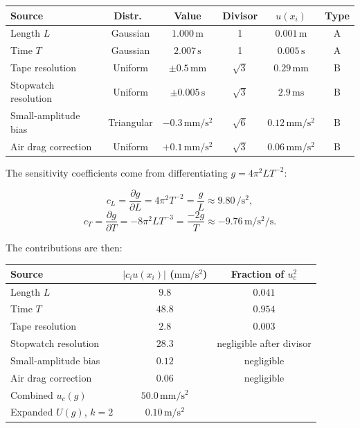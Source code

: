 \begin{center}
\small
\begin{tabular}{lccccc}
\toprule
Source & Distr.\ & Value & Divisor & $u(x_{i})$ & Type \\
\midrule
Length $L$ & Gaussian & $1.000\,\si{\meter}$ & 1 & $0.001\,\si{\meter}$ & A \\
Time $T$ & Gaussian & $2.007\,\si{\second}$ & 1 & $0.005\,\si{\second}$ & A \\
Tape resolution & Uniform & $\pm 0.5\,\si{\milli\meter}$ & $\sqrt{3}$ & $0.29\,\si{\milli\meter}$ & B \\
Stopwatch resolution & Uniform & $\pm 0.005\,\si{\second}$ & $\sqrt{3}$ & $2.9\,\si{\milli\second}$ & B \\
Small-amplitude bias & Triangular & $-0.3\,\si{\milli\meter\per\second\squared}$ & $\sqrt{6}$ & $0.12\,\si{\milli\meter\per\second\squared}$ & B \\
Air drag correction & Uniform & $+0.1\,\si{\milli\meter\per\second\squared}$ & $\sqrt{3}$ & $0.06\,\si{\milli\meter\per\second\squared}$ & B \\
\bottomrule
\end{tabular}
\end{center}

The sensitivity coefficients come from differentiating $g = 4\pi^{2}
L T^{-2}$:

\[
c_{L} = \frac{\partial g}{\partial L} = 4\pi^{2} T^{-2} =
\frac{g}{L} \approx 9.80\,\si{\per\second\squared},
\]
\[
c_{T} = \frac{\partial g}{\partial T} = -8\pi^{2} L T^{-3} =
\frac{-2g}{T} \approx -9.76\,\si{\meter\per\second\squared\per\second}.
\]

The contributions are then:

\begin{center}
\small
\begin{tabular}{lcc}
\toprule
Source & $|c_{i} u(x_{i})|$ ($\si{\milli\meter\per\second\squared}$) & Fraction of $u_{c}^{2}$ \\
\midrule
Length $L$ & $9.8$ & $0.041$ \\
Time $T$ & $48.8$ & $0.954$ \\
Tape resolution & $2.8$ & $0.003$ \\
Stopwatch resolution & $28.3$ & negligible after divisor \\
Small-amplitude bias & $0.12$ & negligible \\
Air drag correction & $0.06$ & negligible \\
\midrule
Combined $u_{c}(g)$ & $50.0\,\si{\milli\meter\per\second\squared}$ & \\
Expanded $U(g)$, $k = 2$ & $0.10\,\si{\meter\per\second\squared}$ & \\
\bottomrule
\end{tabular}
\end{center}

